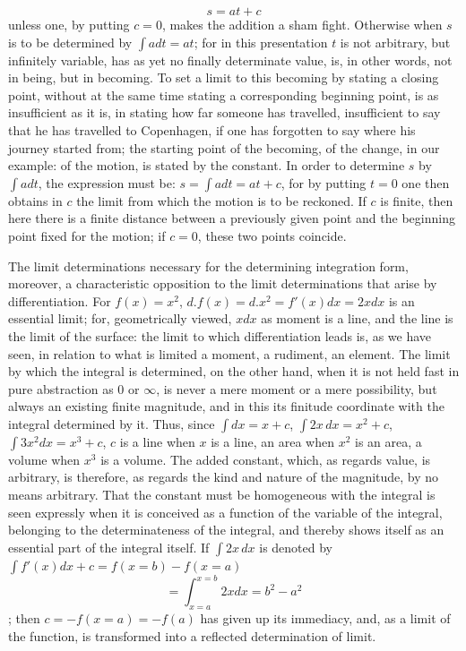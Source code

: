 \documentclass[12pt,a4paper,openany]{book}
\newcommand{\opage}[1]{\marginnote{\footnotesize\textit{[#1]}}}
\begin{document}
\[ s=at+c \]
unless one, by putting $c=0$, makes
the addition a sham fight. Otherwise when $s$ is to be determined by $\int adt=at$; for in this presentation $t$ is not
arbitrary, but infinitely variable, has as yet no finally
determinate value, is, in other words, not in being, but
in becoming. To set a limit to this becoming by stating
a closing point, without at the same time stating a corresponding
beginning point, is as insufficient as it is, in stating
how far someone has travelled, insufficient to say
that he has travelled to Copenhagen, if one has forgotten
to say where his journey started from; the starting point of the
becoming, of the change,
in our example: of the motion, is stated
by the constant. In order to determine $s$ by $\int adt$, the expression must
be: $s=\int adt=at+c$, for by putting
$t=0$ one then obtains in $c$ the limit from which the motion
is to be reckoned. If $c$ is finite, then here there is a finite
distance between a previously given point and the beginning point
fixed for the motion; if $c=0$, these two points
coincide.

The limit determinations necessary for the determining integration
form, moreover, a characteristic opposition
to the limit determinations that arise by differentiation.
For $f(x)=x^{2}$, $d.f(x)=d.x^{2}=f'(x)dx=2xdx$ is an essential limit; for, geometrically viewed, $xdx$ as moment is a line, and the line is the limit of the surface: the
limit to which differentiation leads is, as we have
seen, in relation to what is limited a moment, a rudiment,
\setcounter{footnote}{0}%
\opage{114}an element. The limit by which the integral is determined,
on the other hand, when it is not held fast in pure abstraction
as $0$ or $\infty$, is never a mere moment or a mere
possibility, but always an existing finite magnitude, and in
this its finitude coordinate with the integral determined by it.
Thus, since $\int dx=x+c$, $\int 2x\,dx=x^{2}+c$, $\int 3x^{2}dx=x^{3}+c$, $c$ is a line when $x$ is
a line, an area when $x^{2}$ is an area, a volume when $x^{3}$ is a volume. The added constant, which, as regards
value, is arbitrary, is therefore, as regards the kind and nature
of the magnitude, by no means arbitrary. That
the constant must be homogeneous with the integral is seen expressly
when it is conceived as a function of the variable of the integral,
belonging to the determinateness of the integral, and thereby
shows itself as an essential part of the integral itself. If $\int 2x\,dx$ is denoted by $\int f'(x)dx+c=f(x=b)-f(x=a)$
\[ =\int_{x=a}^{x=b}2xdx=b^{2}-a^{2} \]
; then $c=-f(x=a)=-f(a)$
has given up its immediacy, and, as a limit of the function, is transformed
into a reflected determination of limit.
\end{document}
